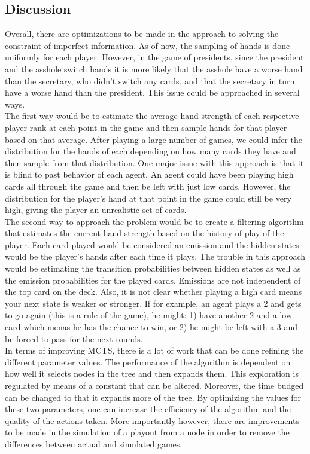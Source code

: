 \documentclass[11pt]{article}
\begin{document}
 
\subsection{Discussion}
Overall, there are optimizations to be made in the approach to solving the constraint of imperfect information. As of now, the sampling of hands is done uniformly for each player. However, in the game of presidents, since the president and the asshole switch hands it is more likely that the asshole have a worse hand than the secretary, who didn't switch any cards, and that the secretary in turn have a worse hand than the president. This issue could be approached in several ways.\\

The first way would be to estimate the average hand strength of each respective player rank at each point in the game and then sample hands for that player based on that average. After playing a large number of games, we could infer the distribution for the hands of each depending on how many cards they have and then sample from that distribution. One major issue with this approach is that it is blind to past behavior of each agent. An agent could have been playing high cards all through the game and then be left with just low cards. However, the distribution for the player's hand at that point in the game could still be very high, giving the player an unrealistic set of cards.\\

 The second way to approach the problem would be to create a filtering algorithm that estimates the current hand strength based on the history of play of the player. Each card played would be considered an emission and the hidden states would be the player's hands after each time it plays. The trouble in this approach would be estimating the transition probabilities between hidden states as well as the emission probabilities for the played cards. Emissions are not independent of the top card on the deck. Also, it is not clear whether playing a high card means your next state is weaker or stronger. If for example, an agent plays a 2 and gets to go again (this is a rule of the game), he might: 1) have another 2 and a low card which menas he has the chance to win, or 2) he might be left with a 3 and be forced to pass for the next rounds.\\

In terms of improving MCTS, there is a lot of work that can be done refining the different parameter values. The performance of the algorithm is dependent on how well it selects nodes in the tree and then expands them. This exploration is regulated by means of a constant that can be altered. Moreover, the time budged can be changed to that it expands more of the tree. By optimizing the values for these two parameters, one can increase the efficiency of the algorithm and the quality of the actions taken. More importantly however, there are improvements to be made in the simulation of a playout from a node in order to remove the differences between actual and simulated games.
\end{document}

